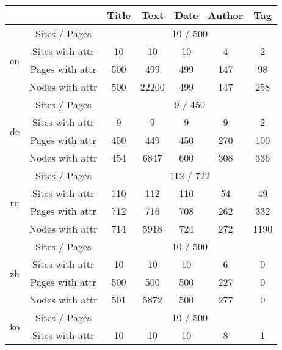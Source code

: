 \renewcommand{\arraystretch}{1.15}

\begin{tabular}{|c|c|ccccc|}
\hline
   &&
   \multicolumn{1}{c}{Title} &
   \multicolumn{1}{c}{Text} &
   \multicolumn{1}{c}{Date} &
   \multicolumn{1}{c}{Author} &
   \multicolumn{1}{c|}{Tag}
\\
\hline
\multirow{4}{*}{en}
& Sites / Pages
& \multicolumn{5}{c|}{10 / 500} \\
\cline{2-7}
& Sites with attr
& 10 & 10 & 10 & 4 & 2 \\

& Pages with attr
& 500 & 499 & 499 & 147 & 98 \\

& Nodes with attr
& 500 & 22200 & 499 & 147 & 258 \\

\cline{1-7}
\multirow{4}{*}{de}
& Sites / Pages
& \multicolumn{5}{c|}{9 / 450} \\
\cline{2-7}
& Sites with attr
& 9 & 9 & 9 & 9 & 2 \\

& Pages with attr
& 450 & 449 & 450 & 270 & 100 \\

& Nodes with attr
& 454 & 6847 & 600 & 308 & 336 \\

\cline{1-7}
\multirow{4}{*}{ru}
& Sites / Pages
& \multicolumn{5}{c|}{112 / 722} \\
\cline{2-7}
& Sites with attr
& 110 & 112 & 110 & 54 & 49 \\

& Pages with attr
& 712 & 716 & 708 & 262 & 332 \\

& Nodes with attr
& 714 & 5918 & 724 & 272 & 1190 \\

\cline{1-7}
\multirow{4}{*}{zh}
& Sites / Pages
& \multicolumn{5}{c|}{10 / 500} \\
\cline{2-7}
& Sites with attr
& 10 & 10 & 10 & 6 & 0 \\

& Pages with attr
& 500 & 500 & 500 & 227 & 0 \\

& Nodes with attr
& 501 & 5872 & 500 & 277 & 0 \\

\cline{1-7}
\multirow{4}{*}{ko}
& Sites / Pages
& \multicolumn{5}{c|}{10 / 500} \\
\cline{2-7}
& Sites with attr
& 10 & 10 & 10 & 8 & 1 \\


\end{tabular}
